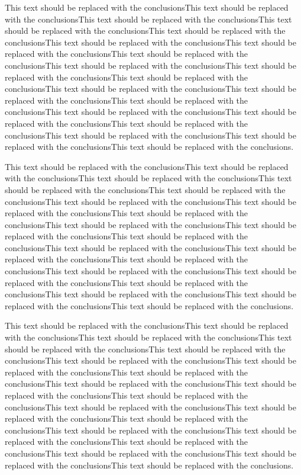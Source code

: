 \documentclass[final,5p,times,twocolumn]{elsarticle}
\begin{document}
This text should be replaced with the conclusionsThis text should be replaced with the conclusionsThis text should be replaced with the conclusionsThis text should be replaced with the conclusionsThis text should be replaced with the conclusionsThis text should be replaced with the conclusionsThis text should be replaced with the conclusionsThis text should be replaced with the conclusionsThis text should be replaced with the conclusionsThis text should be replaced with the conclusionsThis text should be replaced with the conclusionsThis text should be replaced with the conclusionsThis text should be replaced with the conclusionsThis text should be replaced with the conclusionsThis text should be replaced with the conclusionsThis text should be replaced with the conclusionsThis text should be replaced with the conclusionsThis text should be replaced with the conclusionsThis text should be replaced with the conclusionsThis text should be replaced with the conclusions. 

This text should be replaced with the conclusionsThis text should be replaced with the conclusionsThis text should be replaced with the conclusionsThis text should be replaced with the conclusionsThis text should be replaced with the conclusionsThis text should be replaced with the conclusionsThis text should be replaced with the conclusionsThis text should be replaced with the conclusionsThis text should be replaced with the conclusionsThis text should be replaced with the conclusionsThis text should be replaced with the conclusionsThis text should be replaced with the conclusionsThis text should be replaced with the conclusionsThis text should be replaced with the conclusionsThis text should be replaced with the conclusionsThis text should be replaced with the conclusionsThis text should be replaced with the conclusionsThis text should be replaced with the conclusionsThis text should be replaced with the conclusionsThis text should be replaced with the conclusions. 

This text should be replaced with the conclusionsThis text should be replaced with the conclusionsThis text should be replaced with the conclusionsThis text should be replaced with the conclusionsThis text should be replaced with the conclusionsThis text should be replaced with the conclusionsThis text should be replaced with the conclusionsThis text should be replaced with the conclusionsThis text should be replaced with the conclusionsThis text should be replaced with the conclusionsThis text should be replaced with the conclusionsThis text should be replaced with the conclusionsThis text should be replaced with the conclusionsThis text should be replaced with the conclusionsThis text should be replaced with the conclusionsThis text should be replaced with the conclusionsThis text should be replaced with the conclusionsThis text should be replaced with the conclusionsThis text should be replaced with the conclusionsThis text should be replaced with the conclusions. 
\end{document}
